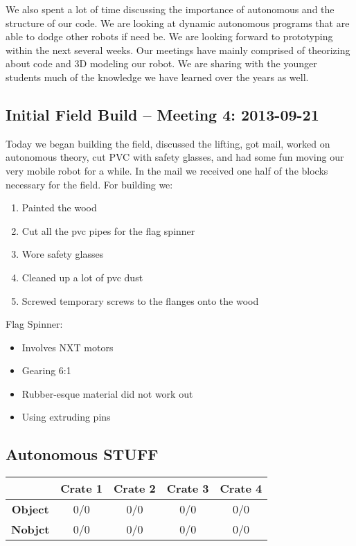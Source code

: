\documentclass{article}
\begin{document}
We also spent a lot of time discussing the importance of autonomous and the structure of our code. We are looking at dynamic autonomous programs that are able to dodge other robots if need be. We are looking forward to prototyping within the next several weeks. Our meetings have mainly comprised of theorizing about code and 3D modeling our robot. We are sharing with the younger students much of the knowledge we have learned over the years as well. 

\newpage
\subsection{Initial Field Build -- Meeting 4: 2013-09-21}
Today we began building the field, discussed the lifting, got mail, worked on autonomous theory, cut PVC with safety glasses, and had some fun moving our very mobile robot for a while.  In the mail we received one half of the blocks necessary for the field.
For building we:
\begin{enumerate}
\item Painted the wood
\item Cut all the pvc pipes for the flag spinner
\item Wore safety glasses
\item Cleaned up a lot of pvc dust
\item Screwed temporary screws to the flanges onto the wood
\end{enumerate}

Flag Spinner:
\begin{itemize}
\item Involves NXT motors
\item Gearing 6:1
\item Rubber-esque material did not work out
\item Using extruding pins
\end{itemize}

\newpage

\subsection{Autonomous STUFF}
\begin{center}
	\begin{tabular}{|c|c|c|c|c|}
		\hline
		 & \textbf{Crate 1} & \textbf{Crate 2} & \textbf{Crate 3} & \textbf{Crate 4} \\ \hline
		\textbf{Object} & 0/0 & 0/0 & 0/0 & 0/0\\ \hline
		\textbf{Nobjct} & 0/0 & 0/0 & 0/0 & 0/0\\ 
		\hline
	\end{tabular}
\end{center}
\end{document}

